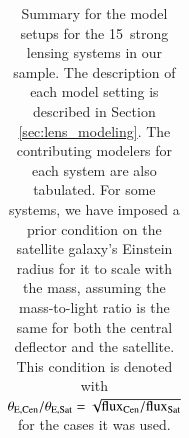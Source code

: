 \documentclass{aa}
\newcommand{\nlens}{15}
\begin{document}
\renewcommand{\arraystretch}{1.3}
\begin{table}
\begingroup
	\setlength{\tabcolsep}{4pt} %
	\renewcommand{\arraystretch}{1.3} %

\caption{\noindent
Summary for the model setups for the \nlens\ strong lensing systems in our sample. The description of each model setting is described in Section \ref{sec:lens_modeling}. The contributing modelers for each system are also tabulated. For some systems, we have imposed a prior condition on the satellite galaxy's Einstein radius for it to scale with the mass, assuming the mass-to-light ratio is the same for both the central deflector and the satellite. This condition is denoted with $\theta_{\rm E, Cen}/\theta_{\rm E, Sat} = \sqrt{{\rm flux_{Cen}}/{\rm flux_{Sat}}}$ for the cases it was used.
\label{table:lens_profiles}
}

\begin{tabular}{llllcl}
\hline


\end{tabular}
\end{table}
\end{document}
